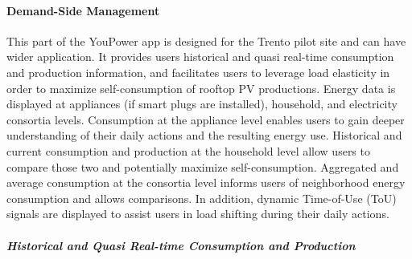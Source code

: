 \paragraph{Demand-Side Management} 

This part of the YouPower app is designed for the Trento pilot site and can have wider application.
It provides users historical and quasi real-time consumption and production information, and facilitates users to leverage load elasticity in order to maximize self-consumption of rooftop PV productions. 
Energy data is displayed at appliances (if smart plugs are installed), household, and electricity consortia levels. %
%
Consumption at the appliance level enables users to gain deeper understanding of their daily actions and the resulting energy use. 
% 
Historical and current consumption and production at the household level allow users to compare those two and potentially maximize self-consumption. 
% 
Aggregated and average consumption at the consortia level informs users of neighborhood energy consumption and allows comparisons.  
% 
In addition, dynamic Time-of-Use (ToU) signals are displayed  to assist users in load shifting during their daily actions.

\subparagraph{Historical and Quasi Real-time Consumption and Production}

